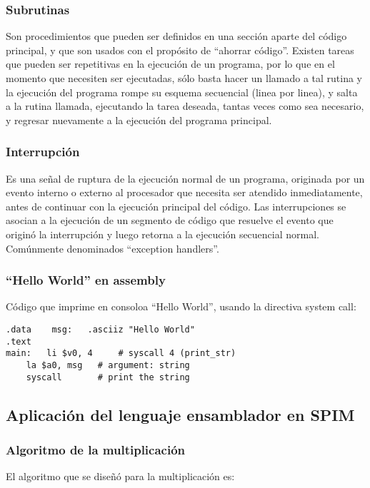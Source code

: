 \documentclass[twocolumn]{IEEEtran}
\begin{document}
\subsubsection{Subrutinas}
\noindent
Son procedimientos que pueden ser definidos en una sección aparte del código principal, y que son usados con el propósito de “ahorrar código”. Existen tareas que pueden ser repetitivas en la ejecución de un programa, por lo que en el momento que necesiten ser ejecutadas, sólo basta hacer un llamado a tal rutina y la ejecución del programa rompe su esquema secuencial (linea por linea), y salta a la rutina llamada, ejecutando la tarea deseada, tantas veces como sea necesario, y regresar nuevamente a la ejecución del programa principal.

\subsubsection{Interrupción}
\noindent
Es una señal de ruptura de la ejecución normal de un programa, originada por un evento interno o externo al procesador que necesita ser atendido inmediatamente, antes de continuar con la ejecución principal del código. Las interrupciones se asocian a la ejecución de un segmento de código que resuelve el evento que originó la interrupción y luego retorna a la ejecución secuencial normal. Comúnmente denominados “exception handlers”.

\subsubsection{“Hello World” en assembly}
\noindent
Código que imprime en consoloa “Hello World”, usando la directiva system call:
\lstset{numbers=left, numberstyle=\tiny, stepnumber=1, numbersep=1pt}
\begin{lstlisting}[firstnumber=7, caption=Codigo inicial, label=code1]
.data    msg:   .asciiz "Hello World"
.text
main:   li $v0, 4     # syscall 4 (print_str)
	la $a0, msg   # argument: string
	syscall       # print the string
\end{lstlisting}

\subsection{Aplicación del lenguaje ensamblador en SPIM}
\noindent
\subsubsection{Algoritmo de la multiplicación}
\noindent
El algoritmo que se diseñó para la multiplicación es:
\end{document}
